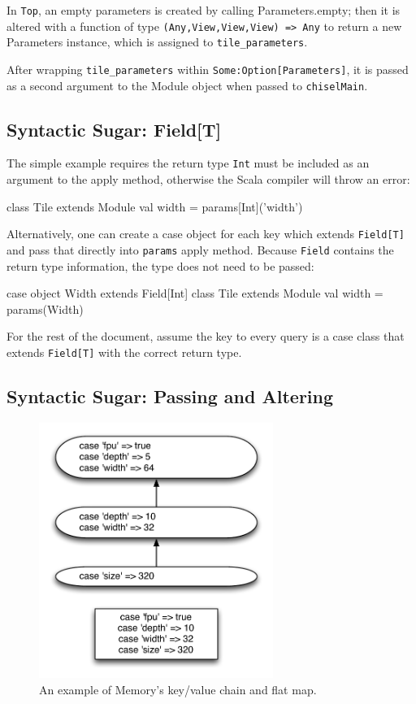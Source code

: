 \documentclass[10pt,twocolumn]{article}
\def\code#1{{\small\tt #1}}
\begin{document}
In \code{Top}, an empty parameters is created by calling Parameters.empty; then it is altered with a function of type \code{(Any,View,View,View) => Any} to return a new Parameters instance, which is assigned to \code{tile\_parameters}. 

After wrapping \code{tile\_parameters} within \code{Some:Option[Parameters]}, it is passed as a second argument to the Module object when passed to \code{chiselMain}.

\subsection{Syntactic Sugar: Field[T]}

The simple example requires the return type \code{Int} must be included as an argument to the apply method, otherwise the Scala compiler will throw an error:

\begin{scala}
class Tile extends Module { 
  val width = params[Int]('width') 
}
\end{scala}

Alternatively, one can create a case object for each key which extends \code{Field[T]} and pass that directly into \code{params} apply method. Because \code{Field} contains the return type information, the type does not need to be passed:

\begin{scala}
case object Width extends Field[Int]
class Tile extends Module { 
  val width = params(Width) 
}
\end{scala}

For the rest of the document, assume the key to every query is a case class that extends \code{Field[T]} with the correct return type.

\subsection{Syntactic Sugar: Passing and Altering}

\begin{figure}[h]
\centering
\includegraphics[width=3in]{figs/alter.pdf}
\caption{An example of Memory's key/value chain and flat map.}
\label{fig:alter}
\end{figure}
\end{document}
